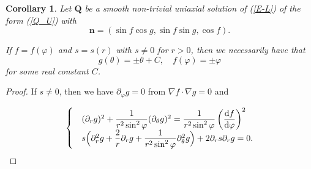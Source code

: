 \documentclass[10pt, a4paper]{article}
\newtheorem{corollary}{Corollary}[section]
\newcommand\dd{\mathrm{d}}
\newcommand\n{\mathbf{n}}
\newcommand\Qvec{\mathbf{Q}}
\newcommand\pp{\partial}
\begin{document}
\begin{corollary}
\label{c1}
Let $\Qvec$ be a smooth non-trivial uniaxial solution of (\ref{E-L}) of the form (\ref{Q_U}) with
$$\n = \left( \sin f \cos g, \sin f \sin g, \cos f \right). $$

If $f= f(\varphi)$ and $s = s(r)$ with $s \neq 0$ for $r > 0$, then we necessarily have that
\begin{equation}
\label{eq:c1}
g(\theta) = \pm \theta + C, \quad f(\varphi) = \pm \varphi
\end{equation}
for some real constant $C$.
\end{corollary}



\begin{proof}
If $s \neq 0$, then we have $\pp_{\varphi} g = 0$ from $\nabla f \cdot \nabla g = 0$ and

\begin{equation}\label{g_fs_s}
\begin{cases}
& (\pp_r g)^2 + \dfrac{1}{r^2 \sin^2 \varphi} (\pp_{\theta} g)^2 = \dfrac{1}{r^2 \sin^2 \varphi}\left( \dfrac{\dd f}{\dd \varphi} \right)^2 \\ 
& s \Bigl( \pp_r^2 g + \dfrac{2}{r} \pp_r g + \dfrac{1}{r^2 \sin^2 \varphi} \pp_{\theta}^2 g \Bigr) + 2 \pp_r s  \pp_r g = 0. \\
\end{cases}
\end{equation}


\end{proof}
\end{document}
